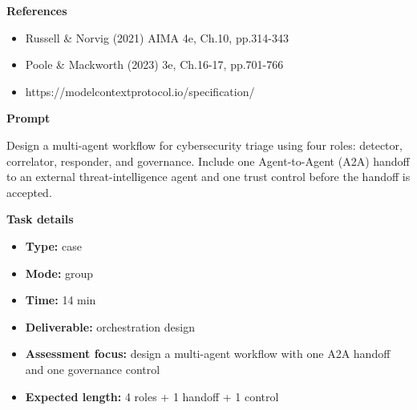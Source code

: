 \documentclass[11pt]{article}
\begin{document}
\begin{tcolorbox}[colback=white,colframe=MidnightBlue,title={Q3 Structured Problem},fonttitle=\bfseries,breakable]
{\large\bfseries\color{MidnightBlue} References}\par\medskip
\begin{itemize}\item Russell \& Norvig (2021) AIMA 4e, Ch.10, pp.314-343
\item Poole \& Mackworth (2023) 3e, Ch.16-17, pp.701-766
\item https://modelcontextprotocol.io/specification/\end{itemize}
\end{tcolorbox}

\begin{tcolorbox}[colback=white,colframe=MidnightBlue,title={Q4 Collaborative Mini-Case},fonttitle=\bfseries,breakable]
\begin{center}
\end{center}

{\large\bfseries\color{MidnightBlue} Prompt}\par\medskip
Design a multi-agent workflow for cybersecurity triage using four roles: detector, correlator, responder, and governance. Include one Agent-to-Agent (A2A) handoff to an external threat-intelligence agent and one trust control before the handoff is accepted.

{\large\bfseries\color{MidnightBlue} Task details}\par\medskip
\begin{itemize}\item \textbf{Type:} case
\item \textbf{Mode:} group
\item \textbf{Time:} 14 min
\item \textbf{Deliverable:} orchestration design
\item \textbf{Assessment focus:} design a multi-agent workflow with one A2A handoff and one governance control
\item \textbf{Expected length:} 4 roles + 1 handoff + 1 control\end{itemize}


\end{tcolorbox}
\end{document}
